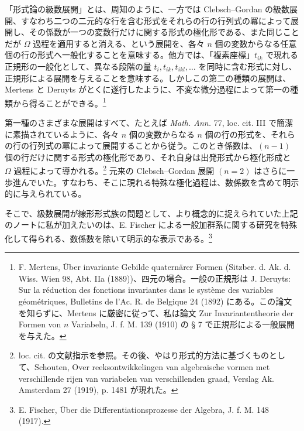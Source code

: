 \documentclass[11pt]{article}
\begin{document}
「形式論の級数展開」とは、周知のように、一方では Clebsch--Gordan の級数展開、すなわち二つの二元的な行を含む形式をそれらの行の行列式の冪によって展開し、その係数が一つの変数行だけに関する形式の極化形である、また同じことだが \(\Omega\) 過程を適用すると消える、という展開を、各々 \(n\) 個の変数からなる任意個の行の形式へ一般化することを意味する。他方では、「複素座標」\(t_{ik}\) で現れる正規形の一般化として、異なる段階の量 \(t_i,t_{ik},t_{ikl},\ldots\) を同時に含む形式に対し、正規形による展開を与えることを意味する。しかしこの第二の種類の展開は、Mertens と Deruyts がとくに遂行したように、不変な微分過程によって第一の種類から得ることができる。\footnote{F. Mertens, Über invariante Gebilde quaternärer Formen (Sitzber. d. Ak. d. Wiss. Wien 98, Abt. IIa (1889))、四元の場合。一般の正規形は J. Deruyts: Sur la réduction des fonctions invariantes dans le système des variables géométriques, Bulletins de l'Ac. R. de Belgique 24 (1892) にある。この論文を知らずに、Mertens に厳密に従って、私は論文 Zur Invariantentheorie der Formen von \(n\) Variabeln, J. f. M. 139 (1910) の § 7 で正規形による一般展開を与えた。}

第一種のさまざまな展開はすべて、たとえば \emph{Math. Ann.} 77, loc. cit. III で簡潔に素描されているように、各々 \(n\) 個の変数からなる \(n\) 個の行の形式を、それらの行の行列式の冪によって展開することから従う。このとき係数は、\((n-1)\) 個の行だけに関する形式の極化形であり、それ自身は出発形式から極化形成と \(\Omega\) 過程によって導かれる。\footnote{loc. cit. の文献指示を参照。その後、やはり形式的方法に基づくものとして、Schouten, Over reeksontwikkelingen van algebraische vormen met verschillende rijen van variabelen van verschillenden graad, Verslag Ak. Amsterdam 27 (1919), p. 1481 が現れた。} 元来の Clebsch--Gordan 展開 \((n=2)\) はさらに一歩進んでいた。すなわち、そこに現れる特殊な極化過程は、数係数を含めて明示的に与えられている。

そこで、級数展開が線形形式族の問題として、より概念的に捉えられていた上記のノートに私が加えたいのは、E. Fischer による一般加群系に関する研究を特殊化して得られる、数係数を除いて明示的な表示である。\footnote{E. Fischer, Über die Differentiationsprozesse der Algebra, J. f. M. 148 (1917).}
\end{document}
